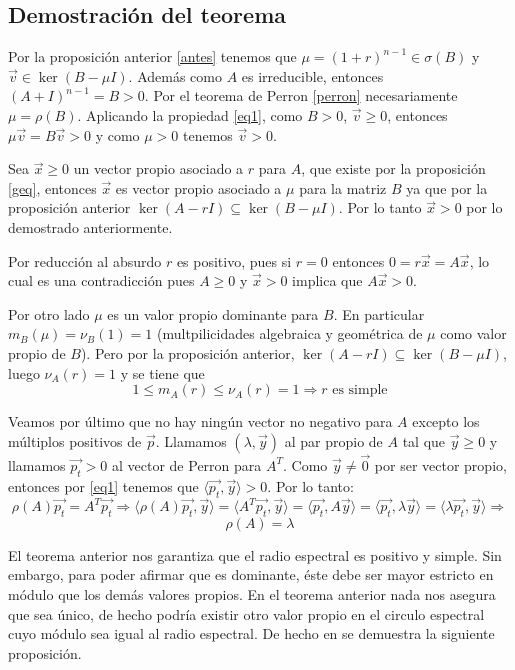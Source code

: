 \documentclass[size=a4, parskip=half, titlepage=false, toc=flat, toc=bib, 12pt]{scrartcl}
\makeatletter
\renewenvironment{proof}[1][\proofname] {\par\pushQED{\qed}\normalfont\topsep6\p@\@plus6\p@\relax\trivlist\item[\hskip\labelsep\itshape\tgpaella#1\@addpunct{.}]\ignorespaces}{\popQED\endtrivlist\@endpefalse}
\theoremstyle{theorem-style}
\theoremstyle{definition-style}
\theoremstyle{remark-style}
\theoremstyle{example-style}
\theoremstyle{definition-style}
\theoremstyle{remark-style}
\renewcommand{\proofname}{\normalfont\tgpaella\bfseries\small DEMOSTRACIÓN}
\makeatother
\begin{document}
\subsection{Demostración del teorema}
\begin{proof}
Por la proposición anterior \ref{antes} tenemos que $\mu = (1+ r)^{n-1} \in \sigma(B)$ y $\vec{v} \in \ker(B - \mu I)$. Además como $A$ es irreducible, entonces $(A + I)^{n-1} = B >0$. Por el teorema de Perron \ref{perron} necesariamente $\mu = \rho(B)$. Aplicando la propiedad \ref{eq1}, como $B > 0$, $\vec{v} \geq 0$, entonces $\mu \vec{v} = B \vec{v} > 0$ y como $\mu > 0$  tenemos $\vec{v} > 0$.

Sea $\vec{x} \geq 0$ un vector propio asociado a $r$ para $A$, que existe por la proposición \ref{geq}, entonces $\vec{x}$ es vector propio asociado a $\mu$ para la matriz $B$ ya que por la proposición anterior $\ker(A - rI) \subseteq \ker(B - \mu I)$. Por lo tanto $\vec{x} > 0$ por lo demostrado anteriormente.

Por reducción al absurdo $r$ es positivo, pues si $r = 0$ entonces $ 0 = r \vec{x} = A \vec{x}$, lo cual es una contradicción pues $A \geq 0$ y $\vec{x} > 0$ implica que $A\vec{x} > 0$.

Por otro lado $\mu$ es un valor propio dominante para $B$. En particular $m_B(\mu) = \nu_B (1) = 1$ (multpilicidades algebraica y geométrica de $\mu$ como valor propio de $B$). Pero por la proposición anterior, $\ker(A - r I) \subseteq \ker(B - \mu I)$, luego $\nu_A(r) = 1$ y se tiene que
$$1 \leq m_A(r) \leq \nu_A(r) = 1 \Rightarrow r \textrm{ es simple} $$

Veamos por último que no hay ningún vector no negativo para $A$ excepto los múltiplos positivos de $\vec{p}$. Llamamos $(\lambda, \vec{y})$ al par propio de $A$ tal que $\vec{y} \geq 0$ y llamamos $\vec{p_t} > 0$ al vector de Perron para $A^T$. Como $\vec{y} \neq \vec{0}$ por ser vector propio, entonces por \ref{eq1} tenemos que $\langle \vec{p_t}, \vec{y} \rangle> 0$. Por lo tanto:
$$\rho(A)\vec{p_t} = A^T \vec{p_t} \Rightarrow \langle \rho(A)\vec{p_t}, \vec{y} \rangle = \langle A^T \vec{p_t}, \vec{y} \rangle = \langle \vec{p_t}, A \vec{y} \rangle = \langle \vec{p_t} , \lambda \vec{y} \rangle = \langle \lambda \vec{p_t}, \vec{y}\rangle  \Rightarrow $$ $$\rho(A) = \lambda $$

\end{proof}

El teorema anterior nos garantiza que el radio espectral es positivo y simple. Sin embargo, para poder afirmar que es dominante, éste debe ser mayor estricto en módulo que los demás valores propios. En el teorema anterior nada nos asegura que sea único, de hecho podría existir otro valor propio en el circulo espectral cuyo módulo sea igual al radio espectral. De hecho en \cite{algebralineal}
se demuestra la siguiente proposición.
\end{document}
